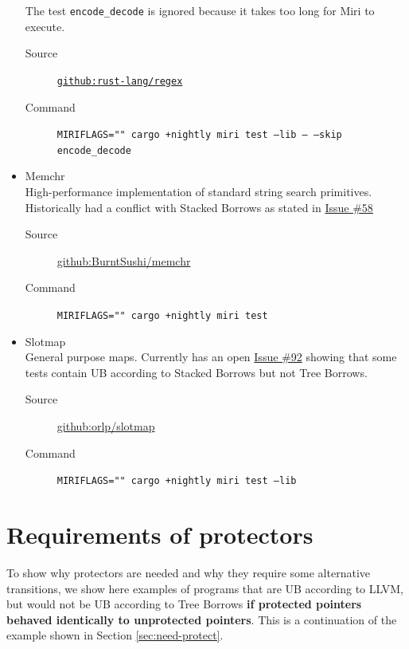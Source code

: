 \documentclass[a4paper,11pt]{article}
\theoremstyle{plain}
\theoremstyle{definition}
\theoremstyle{remark}
\begin{document}
\begin{itemize}
        The test \texttt{encode\_decode} is ignored because it takes too long for Miri to execute.
        \begin{description}
            \item[Source] \href{https://github.com/rust-lang/regex}{\texttt{github:rust-lang/regex}}
            \item[Command] \texttt{MIRIFLAGS="" cargo +nightly miri test --lib -- --skip encode\_decode}
        \end{description}
    \item Memchr\\
        High-performance implementation of standard string search primitives.
        Historically had a conflict with Stacked Borrows as stated in
        \href{https://github.com/BurntSushi/memchr/issues/58}{Issue \#58}
        \begin{description}
            \item[Source] \href{https://github.com/BurntSushi/memchr}{github:BurntSushi/memchr}
            \item[Command] \texttt{MIRIFLAGS="" cargo +nightly miri test}
        \end{description}
    \item Slotmap\\
        General purpose maps. Currently has an open \href{https://github.com/orlp/slotmap/issues/92}{Issue \#92}
        showing that some tests contain UB according to Stacked Borrows but not Tree Borrows.
        \begin{description}
            \item[Source] \href{https://github.com/orlp/slotmap}{github:orlp/slotmap}
            \item[Command] \texttt{MIRIFLAGS="" cargo +nightly miri test --lib}
        \end{description}
\end{itemize}

\newpage
\section{Requirements of protectors}
\label{app:need-protect}

To show why protectors are needed and why they require some alternative
transitions, we show here examples of programs that are UB according to LLVM,
but would not be UB according to Tree Borrows \textbf{if protected pointers behaved identically to unprotected pointers}.
This is a continuation of the example shown in Section \ref{sec:need-protect}.
\end{document}
